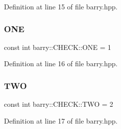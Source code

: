 Definition at line 15 of file barry.\+hpp.

\mbox{\label{namespacebarry_1_1_c_h_e_c_k_add50baad3a196b1979efbbf9e6c86913}} 
\subsubsection{\texorpdfstring{O\+NE}{ONE}}
{\footnotesize\ttfamily const int barry\+::\+C\+H\+E\+C\+K\+::\+O\+NE = 1}



Definition at line 16 of file barry.\+hpp.

\mbox{\label{namespacebarry_1_1_c_h_e_c_k_a6aa56c3d8a8260d90867278d21ace4d2}} 
\subsubsection{\texorpdfstring{T\+WO}{TWO}}
{\footnotesize\ttfamily const int barry\+::\+C\+H\+E\+C\+K\+::\+T\+WO = 2}



Definition at line 17 of file barry.\+hpp.

